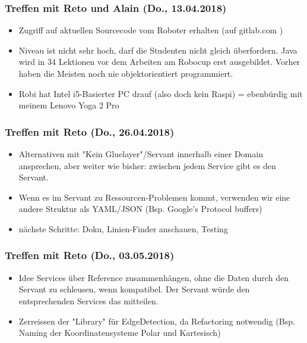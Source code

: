 \subsubsection{Treffen mit Reto und Alain (Do., 13.04.2018)}
\begin{itemize}
	\item Zugriff auf aktuellen Sourcecode vom Roboter erhalten (auf gitlab.com \cite{gitlab.com/solidus/hefei})
	\item Niveau ist nicht sehr hoch, darf die Studenten nicht gleich überfordern. Java wird in 34 Lektionen vor dem Arbeiten am Robocup erst ausgebildet. Vorher haben die Meisten noch nie objektorientiert programmiert.
	\item Robi hat Intel i5-Basierter PC drauf (also doch kein Raspi) = ebenbürdig mit meinem Lenovo Yoga 2 Pro
\end{itemize}

\subsubsection{Treffen mit Reto (Do., 26.04.2018)}
\begin{itemize}
	\item Alternativen mit "Kein Gluelayer"/Servant innerhalb einer Domain ansprechen, aber weiter wie bisher: zwischen jedem Service gibt es den Servant.
	\item Wenn es im Servant zu Ressourcen-Problemen kommt, verwenden wir eine andere Struktur als YAML/JSON (Bsp. Google's Protocol buffers)
	\item nächste Schritte: Doku, Linien-Finder anschauen, Testing
\end{itemize}

\subsubsection{Treffen mit Reto (Do., 03.05.2018)}
\begin{itemize}
	\item Idee Services über Reference zusammenhängen, ohne die Daten durch den Servant zu schleusen, wenn kompatibel. Der Servant würde den entsprechenden Services das mitteilen.
	\item Zerreissen der "Library" für EdgeDetection, da Refactoring notwendig (Bsp. Naming der Koordinatensysteme Polar und Kartesisch)
\end{itemize}

